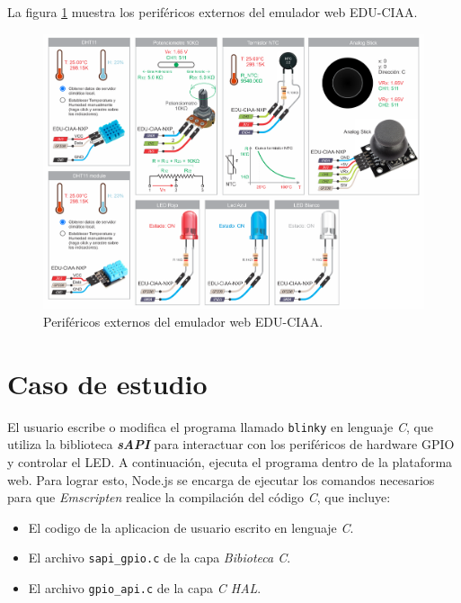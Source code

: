 La figura \ref{fig:perifericosCIAA} muestra los periféricos externos del emulador web EDU-CIAA.

\begin{figure}[ht]
	\centering
	\includegraphics[scale=.40]{./Figures/perifericosCIAA.png}
	\caption{Periféricos externos del emulador web EDU-CIAA.}
	\label{fig:perifericosCIAA}
\end{figure}


\hfill \break
\hfill \break
\hfill \break
\hfill \break
\hfill \break
\hfill \break
\hfill \break
\hfill \break

\section{Caso de estudio}
\label{sec:caso_de_estudio}

El usuario escribe o modifica el programa llamado \texttt{blinky} en lenguaje \textit{C}, que utiliza la biblioteca \textit{\textbf{sAPI}} para interactuar con los periféricos de hardware GPIO y controlar el LED. A continuación, ejecuta el programa dentro de la plataforma web. Para lograr esto, Node.js se encarga de ejecutar los comandos necesarios para que \textit{Emscripten} realice la compilación del código \textit{C}, que incluye: 

\begin{itemize}
	\item El codigo de la aplicacion de usuario escrito en lenguaje \textit{C}.
	\item El archivo \texttt{sapi\_gpio.c} de la capa \textit{Bibioteca C}.
	\item El archivo \texttt{gpio\_api.c} de la capa \textit{C HAL}.
\end{itemize} 

